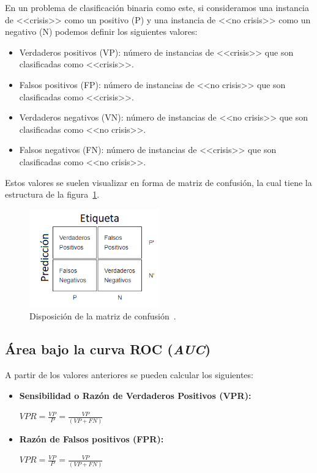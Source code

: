 En un problema de clasificación binaria como este, si consideramos una instancia de <<crisis>> como un positivo (P) y una instancia de <<no crisis>> como un negativo (N) podemos definir los siguientes valores: 

\begin{itemize}
	\item Verdaderos positivos (VP): número de instancias de <<crisis>> que son clasificadas como <<crisis>>. 
	\item Falsos positivos (FP): número de instancias de <<no crisis>> que son clasificadas como <<crisis>>. 
	\item Verdaderos negativos (VN): número de instancias de <<no crisis>> que son clasificadas como <<no crisis>>. 
	\item Falsos negativos (FN): número de instancias de <<crisis>> que son clasificadas como <<no crisis>>.  
\end{itemize}

Estos valores se suelen visualizar en forma de matriz de confusión, la cual tiene la estructura de la figura~\ref{fig:matrizconfusion}.

\begin{figure}[H]
	\centering
	\includegraphics[width=0.5\textwidth]{../img/matrizconfusion.png}
	\caption[Disposición de la matriz de confusión.]{Disposición de la matriz de confusión~\cite{wiki:roc}.}
	\label{fig:matrizconfusion}
\end{figure}  

\subsection{Área bajo la curva ROC (\textit{AUC})}

A partir de los valores anteriores se pueden calcular los siguientes: 

\begin{itemize}
	\item \textbf{Sensibilidad o Razón de Verdaderos Positivos (VPR):}
	\begin{center}
		$VPR=\frac{VP}{P}=\frac{VP}{(VP+FN)}$ 
	\end{center} 
	\item \textbf{Razón de Falsos positivos (FPR):} 
	\begin{center}
		$VPR=\frac{VP}{P}=\frac{VP}{(VP+FN)}$ 
	\end{center} 
\end{itemize}

